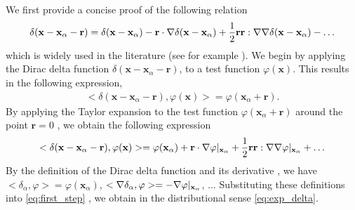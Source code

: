 We first provide a concise proof of the following relation
\begin{equation}
    \delta(\textbf{x} - \textbf{x}_\alpha - \textbf{r})
    = \delta(\textbf{x} - \textbf{x}_\alpha)
    - \textbf{r}\cdot\grad \delta(\textbf{x} - \textbf{x}_\alpha)
    + \frac{1}{2}\textbf{rr}:\grad\grad\delta(\textbf{x} - \textbf{x}_\alpha) 
    - \ldots
\label{eq:exp_delta}
\end{equation}
which is widely used in the literature (see for example \citet{zhang2023evolution}). 
We begin by applying the Dirac delta function $\delta(\textbf{x} - \textbf{x}_\alpha - \textbf{r})$, to a test function $\varphi(\textbf{x})$.
This results in the following expression,
\begin{align*}
    < \delta(\textbf{x} - \textbf{x}_\alpha - \textbf{r}), \varphi(\textbf{x})> 
    =
    \varphi(\textbf{x}_\alpha + \textbf{r}).  
\end{align*}
By applying the Taylor expansion to the test function $\varphi(\textbf{x}_\alpha + \textbf{r})$ around the point $\textbf{r} = 0$ , we obtain the following expression
\begin{equation}
    < \delta(\textbf{x} - \textbf{x}_\alpha - \textbf{r}), \varphi(\textbf{x})> 
    =
    \varphi(\textbf{x}_\alpha) 
    + \textbf{r} \cdot \grad \varphi|_{\textbf{x}_\alpha}
    + \frac{1}{2}\textbf{r}\textbf{r} : \grad\grad \varphi|_{\textbf{x}_\alpha}
    + \ldots
    \label{eq:first_step}
\end{equation}
By the definition of the Dirac delta function and its derivative \citep{appel2007}, we have  %
$  <\delta_\alpha, \varphi> = \varphi(\textbf{x}_\alpha)$, %
$<\mathbf{\nabla}\delta_\alpha, \varphi> = -\mathbf{\nabla}\varphi|_{\textbf{x}_\alpha} $,
$...$  
Substituting these definitions into \ref{eq:first_step} , we obtain in the distributional sense \ref{eq:exp_delta}. 

